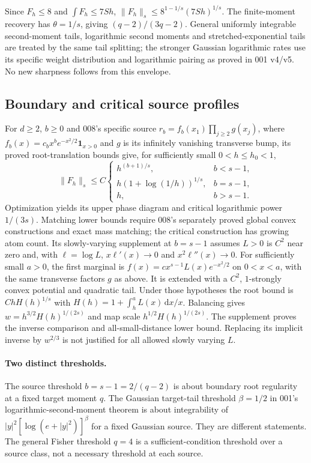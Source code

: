 \documentclass[11pt]{article}
\theoremstyle{remark}\newtheorem{remark}[theorem]{Remark}
\newcommand{\dd}{\,\mathrm d}
\newcommand{\norm}[1]{\lVert#1\rVert}
\begin{document}
Since $F_h\le8$ and $\int F_h\le7Sh$, $\norm{F_h}_s\le8^{1-1/s}(7Sh)^{1/s}$. The finite-moment recovery has $\theta=1/s$, giving $(q-2)/(3q-2)$. General uniformly integrable second-moment tails, logarithmic second moments and stretched-exponential tails are treated by the same tail splitting; the stronger Gaussian logarithmic rates use its specific weight distribution and logarithmic pairing as proved in 001 v4/v5. No new sharpness follows from this envelope.

\subsection{Boundary and critical source profiles}
For $d\ge2$, $b\ge0$ and 008's specific source $r_b=f_b(x_1)\prod_{j\ge2}g(x_j)$, where $f_b(x)=c_bx^be^{-x^2/2}\mathbf1_{x>0}$ and $g$ is its infinitely vanishing transverse bump, its proved root-translation bounds give, for sufficiently small $0<h\le h_0<1$,
\[
 \norm{F_h}_s\le C\begin{cases}
 h^{(b+1)/s},&b<s-1,\\
 h(1+\log(1/h))^{1/s},&b=s-1,\\
 h,&b>s-1.
 \end{cases}
\]
Optimization yields its upper phase diagram and critical logarithmic power $1/(3s)$. Matching lower bounds require 008's separately proved global convex constructions and exact mass matching; the critical construction has growing atom count. Its slowly-varying supplement at $b=s-1$ assumes $L>0$ is $C^2$ near zero and, with $\ell=\log L$, $x\ell'(x)\to0$ and $x^2\ell''(x)\to0$. For sufficiently small $a>0$, the first marginal is $f(x)=c x^{s-1}L(x)e^{-x^2/2}$ on $0<x<a$, with the same transverse factors $g$ as above. It is extended with a $C^2$, $1$-strongly convex potential and quadratic tail. Under those hypotheses the root bound is $ChH(h)^{1/s}$ with $H(h)=1+\int_h^aL(x)\dd x/x$. Balancing gives $w=h^{3/2}H(h)^{1/(2s)}$ and map scale $h^{1/2}H(h)^{1/(2s)}$. The supplement proves the inverse comparison and all-small-distance lower bound. Replacing its implicit inverse by $w^{2/3}$ is not justified for all allowed slowly varying $L$.

\paragraph{Two distinct thresholds.} The source threshold $b=s-1=2/(q-2)$ is about boundary root regularity at a fixed target moment $q$. The Gaussian target-tail threshold $\beta=1/2$ in 001's logarithmic-second-moment theorem is about integrability of $|y|^2[\log(e+|y|^2)]^\beta$ for a fixed Gaussian source. They are different statements. The general Fisher threshold $q=4$ is a sufficient-condition threshold over a source class, not a necessary threshold at each source.
\end{document}
